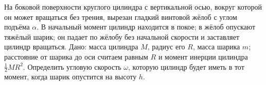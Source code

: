 На боковой поверхности круглого цилиндра с вертикальной осью,
вокруг которой он может вращаться без трения,
вырезан гладкий винтовой жёлоб с углом подъёма $\alpha$.
В начальный момент цилиндр находится в покое; в жёлоб опускают тяжёлый шарик;
он падает по жёлобу без начальной скорости и заставляет цилиндр вращаться.
Дано: масса цилиндра $M$, радиус его $R$, масса шарика $m$;
расстояние от шарика до оси считаем равным $R$ и момент инерции цилиндра
$\frac{1}{2}MR^2$.
Определить угловую скорость $\omega$, которую цилиндр будет иметь в тот момент,
когда шарик опустится на высоту $h$.
